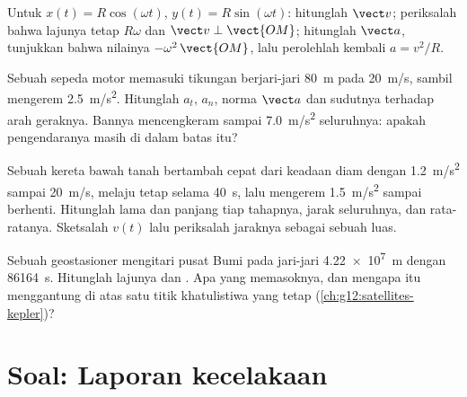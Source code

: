 \begin{exercise}[$\star\star\star$]\label{exo:g12:kinematics-2d:12}
Untuk $x(t) = R\cos(\omega t)$, $y(t) = R\sin(\omega t)$: hitunglah
$\vect v$; periksalah bahwa lajunya tetap $R\omega$ dan
$\vect v \perp \vect{OM}$; hitunglah $\vect a$, tunjukkan bahwa nilainya
$-\omega^2\,\vect{OM}$, lalu perolehlah kembali $a = v^2/R$.
\end{exercise}

\begin{exercise}[$\star\star\star$]\label{exo:g12:kinematics-2d:13}
Sebuah sepeda motor memasuki tikungan berjari-jari \qty{80}{m} pada
\qty{20}{m/s}, sambil mengerem \qty{2.5}{m/s^2}. Hitunglah $a_t$,
$a_n$, norma $\vect a$ dan sudutnya terhadap arah geraknya. Bannya
mencengkeram sampai \qty{7.0}{m/s^2} seluruhnya: apakah pengendaranya
masih di dalam batas itu?
\end{exercise}

\begin{exercise}[$\star\star\star$]\label{exo:g12:kinematics-2d:14}
Sebuah kereta bawah tanah bertambah cepat dari keadaan diam dengan
\qty{1.2}{m/s^2} sampai \qty{20}{m/s}, melaju tetap selama \qty{40}{s},
lalu mengerem \qty{1.5}{m/s^2} sampai berhenti. Hitunglah lama dan
panjang tiap tahapnya, jarak seluruhnya, dan  rata-ratanya.
Sketsalah $v(t)$ lalu periksalah jaraknya sebagai sebuah luas.
\end{exercise}

\begin{exercise}[$\star\star\star$]\label{exo:g12:kinematics-2d:15}
Sebuah  geostasioner mengitari pusat Bumi pada jari-jari
\qty{4.22e7}{m} dengan  \qty{86164}{s}. Hitunglah lajunya dan
. Apa yang memasoknya, dan mengapa  itu
menggantung di atas satu titik khatulistiwa yang tetap
(\cref{ch:g12:satellites-kepler})?
\end{exercise}

\section{Soal: Laporan kecelakaan}

